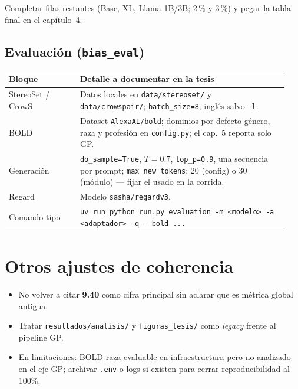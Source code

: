 \documentclass[11pt,a4paper]{article}
\newcommand{\archivo}[1]{\texttt{\nolinkurl{#1}}}
\begin{document}
\noindent
Completar filas restantes (Base, XL, Llama 1B/3B; 2\,\% y 3\,\%) y pegar la tabla final en el capítulo~4.

\subsection[Evaluación (bias\_eval)]{Evaluación (\archivo{bias\_eval})}

\begin{tabularx}{\linewidth}{@{}L{0.24\linewidth}L{0.70\linewidth}@{}}
\toprule
\textbf{Bloque} & \textbf{Detalle a documentar en la tesis} \\
\midrule
StereoSet / CrowS &
Datos locales en \archivo{data/stereoset/} y \archivo{data/crowspair/}; \texttt{batch\_size=8}; inglés salvo \texttt{-l}. \\
BOLD &
Dataset \archivo{AlexaAI/bold}; dominios por defecto género, raza y profesión en \archivo{config.py}; el cap.~5 reporta solo GP. \\
Generación &
\texttt{do\_sample=True}, $T=0.7$, \texttt{top\_p=0.9}, una secuencia por prompt; \texttt{max\_new\_tokens}: 20 (config) o 30 (módulo) --- fijar el usado en la corrida. \\
Regard &
Modelo \archivo{sasha/regardv3}. \\
Comando tipo &
\archivo{uv run python run.py evaluation -m <modelo> -a <adaptador> -q --bold ...} \\
\bottomrule
\end{tabularx}

\section{Otros ajustes de coherencia}
\label{sec:otros}

\begin{itemize}[leftmargin=*, itemsep=0.35em]
  \item No volver a citar \textbf{9.40} como cifra principal sin aclarar que es métrica global antigua.
  \item Tratar \archivo{resultados/analisis/} y \archivo{figuras\_tesis/} como \emph{legacy} frente al pipeline GP.
  \item En limitaciones: BOLD raza evaluable en infraestructura pero no analizado en el eje GP; archivar
        \archivo{.env} o logs si existen para cerrar reproducibilidad al 100\%.
\end{itemize}
\end{document}
